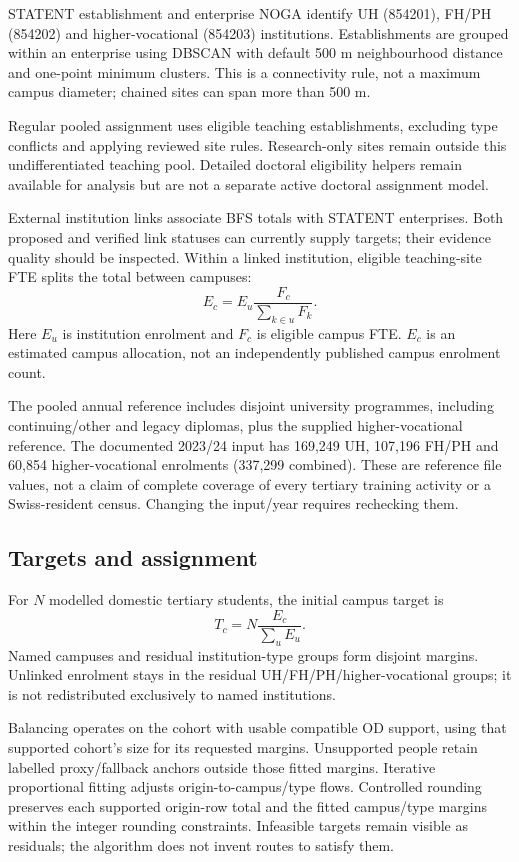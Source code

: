 \documentclass[11pt,a4paper]{article}
\begin{document}
STATENT establishment and enterprise NOGA identify UH (854201), FH/PH
(854202) and higher-vocational (854203) institutions. Establishments are
grouped within an enterprise using DBSCAN with default 500 m neighbourhood
distance and one-point minimum clusters. This is a connectivity rule, not a
maximum campus diameter; chained sites can span more than 500 m.

Regular pooled assignment uses eligible teaching establishments, excluding
type conflicts and applying reviewed site rules. Research-only sites remain
outside this undifferentiated teaching pool. Detailed doctoral eligibility
helpers remain available for analysis but are not a separate active doctoral
assignment model.

External institution links associate BFS totals with STATENT enterprises.
Both proposed and verified link statuses can currently supply targets; their
evidence quality should be inspected. Within a linked institution, eligible
teaching-site FTE splits the total between campuses:
\[
 E_c=E_u\frac{F_c}{\sum_{k\in u}F_k}.
\]
Here \(E_u\) is institution enrolment and \(F_c\) is eligible campus FTE.
\(E_c\) is an estimated campus allocation, not an independently published
campus enrolment count.

The pooled annual reference includes disjoint university programmes, including
continuing/other and legacy diplomas, plus the supplied higher-vocational
reference. The documented 2023/24 input has 169,249 UH, 107,196 FH/PH and
60,854 higher-vocational enrolments (337,299 combined). These are reference
file values, not a claim of complete coverage of every tertiary training
activity or a Swiss-resident census. Changing the input/year requires rechecking them.

\subsection{Targets and assignment}

For \(N\) modelled domestic tertiary students, the initial campus target is
\[
 T_c=N\frac{E_c}{\sum_u E_u}.
\]
Named campuses and residual institution-type groups form disjoint margins.
Unlinked enrolment stays in the residual UH/FH/PH/higher-vocational groups;
it is not redistributed exclusively to named institutions.

Balancing operates on the cohort with usable compatible OD support, using
that supported cohort's size for its requested margins. Unsupported people
retain labelled proxy/fallback anchors outside those fitted margins. Iterative
proportional fitting adjusts origin-to-campus/type flows. Controlled rounding
preserves each supported origin-row total and the fitted campus/type margins
within the integer rounding constraints. Infeasible targets remain visible
as residuals; the algorithm does not invent routes to satisfy them.
\end{document}

